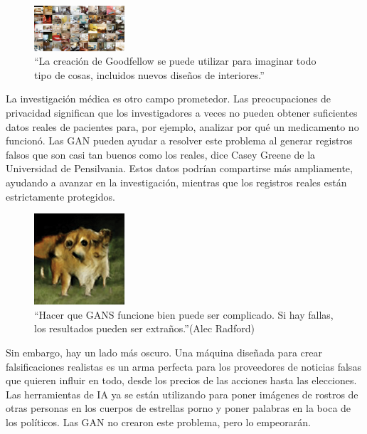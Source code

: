 \documentclass[a4paper]{article}
\begin{document}
\begin{figure} %
    \centering
     \includegraphics[width=0.3\textwidth]{./images/interiores.png}
	  \caption{``La creación de Goodfellow se puede utilizar para imaginar todo tipo de cosas, incluidos nuevos diseños de interiores.''}
\end{figure}




La investigación médica es otro campo prometedor. Las 
preocupaciones de privacidad significan que los investigadores a 
veces no pueden obtener suficientes datos reales de pacientes 
para, por ejemplo, analizar por qué un medicamento no funcionó. 
Las GAN pueden ayudar a resolver este problema al generar 
registros falsos que son casi tan buenos como los reales, dice 
Casey Greene de la Universidad de Pensilvania. Estos datos podrían 
compartirse más ampliamente, ayudando a avanzar en la 
investigación, mientras que los registros reales están 
estrictamente protegidos.
\begin{figure} %
    \centering
     \includegraphics[width=0.3\textwidth]{./images/rares_images.png}
	  \caption{``Hacer que GANS funcione bien puede ser complicado. Si hay fallas, los resultados pueden ser extraños.''(Alec Radford)}
\end{figure}
Sin embargo, hay un lado más oscuro. Una máquina diseñada para 
crear falsificaciones realistas es un arma perfecta para los 
proveedores de noticias falsas que quieren influir en todo, desde 
los precios de las acciones hasta las elecciones. Las herramientas 
de IA ya se están utilizando para poner imágenes de rostros de 
otras personas en los cuerpos de estrellas porno y poner palabras 
en la boca de los políticos. Las GAN no crearon este problema, 
pero lo empeorarán.
 
\end{document}
